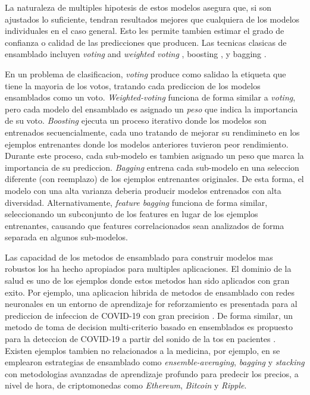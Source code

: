 La naturaleza de multiples hipotesis de estos modelos asegura que, si son ajustados lo suficiente, tendran resultados mejores que cualquiera de los modelos individuales en el caso general. Esto les permite tambien estimar el grado de confianza o calidad de las predicciones que producen. Las tecnicas clasicas de ensamblado incluyen \textit{voting} and \textit{weighted voting} \parencite{dietterich2000ensemble}, boosting \parencite{schapire1990strength}, y bagging \parencite{breiman1996bagging}.

En un problema de clasificacion, \textit{voting} produce como salidao la etiqueta que tiene la mayoria de los votos, tratando cada prediccion de los modelos ensamblados como un voto. \textit{Weighted-voting} funciona de forma similar a \textit{voting}, pero cada modelo del ensamblado es asignado un \textit{peso} que indica la importancia de su voto. \textit{Boosting} ejecuta un proceso iterativo donde los modelos son entrenados secuencialmente, cada uno tratando de mejorar su rendimineto en los ejemplos entrenantes donde los modelos anteriores tuvieron peor rendimiento. Durante este proceso, cada sub-modelo es tambien asignado un peso que marca la importancia de su prediccion. \textit{Bagging} entrena cada sub-modelo en una seleccion diferente (con reemplazo) de los ejemplos entrenantes originales. De esta forma, el modelo con una alta varianza deberia producir modelos entrenados con alta diversidad. Alternativamente, \textit{feature bagging} funciona de forma similar, seleccionando un subconjunto de los features en lugar de los ejemplos entrenantes, causando que features correlacionados sean analizados de forma separada en algunos sub-modelos.

Las capacidad de los metodos de ensamblado para construir modelos mas robustos los ha hecho apropiados para multiples aplicaciones. El dominio de la salud es uno de los ejemplos donde estos metodos han sido aplicados con gran exito. Por ejemplo, una aplicacion hibrida de metodos de ensamblado con redes neuronales en un entorno de aprendizaje for reforzamiento es presentada para al prediccion de infeccion de COVID-19 con gran precision \parencite{JIN2022105560}. De forma similar, un metodo de toma de decision multi-criterio basado en ensemblados es propuesto para la deteccion de COVID-19 a partir del sonido de la tos en pacientes \parencite{CHOWDHURY2022105405}. Existen ejemplos tambien no relacionados a la medicina, por ejemplo, en \parencite{livieris2020ensemble} se emplearon estrategias de ensamblado como \textit{ensemble-averaging}, \textit{bagging} y \textit{stacking} con metodologias avanzadas de aprendizaje profundo para predecir los precios, a nivel de hora, de criptomonedas como \textit{Ethereum}, \textit{Bitcoin} y \textit{Ripple}.

